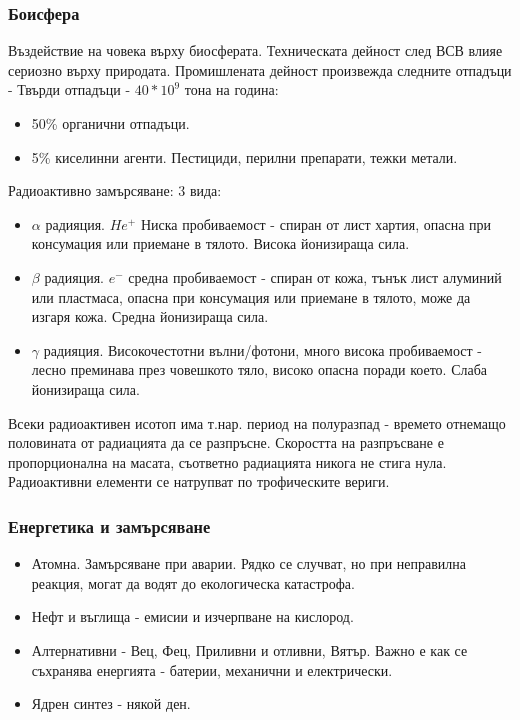 \documentclass[12pt, a4paper]{article}
\begin{document}
\subsubsection*{Боисфера}

Въздействие на човека върху биосферата. Техническата дейност след ВСВ влияе сериозно върху природата. Промишлената дейност произвежда следните отпадъци - Твърди отпадъци - $40*10^9$ тона на година:
\begin{itemize}
	\item{50\%} органични отпадъци.
	\item{5\%} киселинни агенти.
	Пестициди, перилни препарати, тежки метали.
\end{itemize}
Радиоактивно замърсяване: 3 вида:
\begin{itemize}
	\item $\alpha$ радияция. $He^+$ Ниска пробиваемост - спиран от лист хартия, опасна при консумация или приемане в тялото. Висока йонизираща сила.
	\item $\beta$ радияция. $e^-$ средна пробиваемост - спиран от кожа, тънък лист алуминий или пластмаса, опасна при консумация или приемане в тялото, може да изгаря кожа. Средна йонизираща сила.
	\item $\gamma$ радияция. Високочестотни вълни/фотони, много висока пробиваемост - лесно преминава през човешкото тяло, високо опасна поради което. Слаба йонизираща сила.
\end{itemize}

Всеки радиоактивен исотоп има т.нар. период на полуразпад - времето отнемащо половината от радиацията да се разпръсне. Скоростта на разпръсване е пропорционална на масата, съответно радиацията никога не стига нула. Радиоактивни елементи се натрупват по трофическите вериги. 

\subsubsection*{Енергетика и замърсяване}
\begin{itemize}
	\item Атомна. Замърсяване при аварии. Рядко се случват, но при неправилна реакция, могат да водят до екологическа катастрофа.
	\item Нефт и въглища - емисии и изчерпване на кислород.
	\item Алтернативни - Вец, Фец, Приливни и отливни, Вятър. Важно е как се съхранява енергията - батерии, механични и електрически.
	\item Ядрен синтез - някой ден.
\end{itemize}
\end{document}
